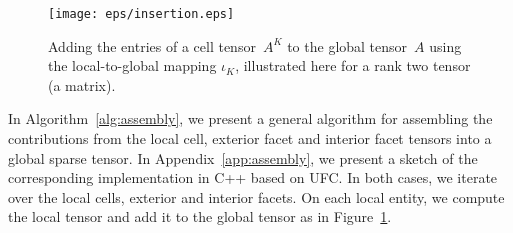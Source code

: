 \begin{figure}[htbp]
  \begin{center}
    \texttt{[image: eps/insertion.eps]}
    \caption{Adding the entries of a cell tensor~$A^K$ to the
      global tensor~$A$ using the  local-to-global mapping
      $\iota_K$, illustrated here for a rank two
      tensor (a matrix).}
    \label{fig:insertion}
  \end{center}
\end{figure}

In Algorithm~\ref{alg:assembly}, we present a general algorithm for
assembling the contributions from the local cell, exterior facet and
interior facet tensors into a global sparse tensor. In
Appendix~\ref{app:assembly}, we present a sketch of the corresponding
implementation in C++ based on UFC. In both cases, we iterate over the
local cells, exterior and interior facets. On each local entity, we
compute the local tensor and add it to the global tensor as in
Figure~\ref{fig:insertion}.

